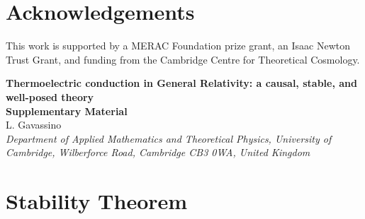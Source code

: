 \documentclass[a4paper, amsfonts, amssymb, amsmath, reprint, showkeys, nofootinbib, twoside,notitlepage]{revtex4-1}
\theoremstyle{definition}
\theoremstyle{theorem}
\begin{document}
\section*{Acknowledgements}

This work is supported by a MERAC Foundation prize grant,  an Isaac Newton Trust Grant, and funding from the Cambridge Centre for Theoretical Cosmology.







\newpage


\onecolumngrid
\newpage
\begin{center}
\textbf{\large Thermoelectric conduction in General Relativity: a causal, stable, and well-posed theory\\Supplementary Material}\\[.2cm]
  L. Gavassino\\[.1cm]
  {\itshape Department of Applied Mathematics and Theoretical Physics, University of Cambridge, Wilberforce Road, Cambridge CB3 0WA, United Kingdom\\}
\end{center}

\setcounter{equation}{0}
\setcounter{figure}{0}
\setcounter{table}{0}
\setcounter{page}{1}
\renewcommand{\theequation}{S\arabic{equation}}
\renewcommand{\thefigure}{S\arabic{figure}}


\section*{Stability Theorem}
\end{document}
